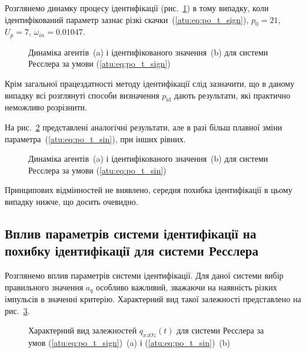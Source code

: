 Розглянемо динамку процесу ідентифікації (рис.~\ref{atu:f:ross_id_sign})
в тому випадку, коли ідентифікований параметр зазнає різкі
скачки~(\ref{atu:eq:po_t_sign}),
$ p_0 = 21 $,
$ U_p = 7 $,
$ \omega_{in} = 0.01047 $.

\begin{figure}[htb!]
  \caption{Динаміка агентів~(a) і ідентифікованого значення~(b) для системи Ресслера за умови (\ref{atu:eq:po_t_sign})}
\label{atu:f:ross_id_sign}
\end{figure}

Крім загальної працездатності методу ідентифікації слід
зазначити, що в даному випадку всі розглянуті способи визначення
$ p_\mathrm{id} $ дають результати, які практично неможливо розрізнити.

На рис.~\ref{atu:f:ross_id_sin} представлені аналогічні результати, але
в разі більш плавної зміни параметра~(\ref{atu:eq:po_t_sin}), при інших
рівних.


\begin{figure}[htb!]
  \caption{Динаміка агентів~(a) і ідентифікованого значення~(b) для системи Ресслера за умови (\ref{atu:eq:po_t_sin})}
\label{atu:f:ross_id_sin}
\end{figure}

Принципових відмінностей не виявлено, середня похибка
ідентифікації в цьому випадку нижче, що досить очевидно.



\subsection{Вплив параметрів системи ідентифікації на похибку ідентифікації для системи Ресслера} %

Розглянемо вплив параметрів системи ідентифікації. Для даної
системи вибір правильного значення
$a_q$ особливо важливий, зважаючи на наявність різких імпульсів
в значенні критерію. Характерний вид такої залежності
представлено на рис.~\ref{atu:f:ross_q_t}.

\begin{figure}[htb!]
\caption{Характерний вид залежностей $ q_{xzOz} (t) $ для системи Ресслера за умов (\ref{atu:eq:po_t_sign})~(a) і (\ref{atu:eq:po_t_sin})~(b)}
\label{atu:f:ross_q_t}
\end{figure}

